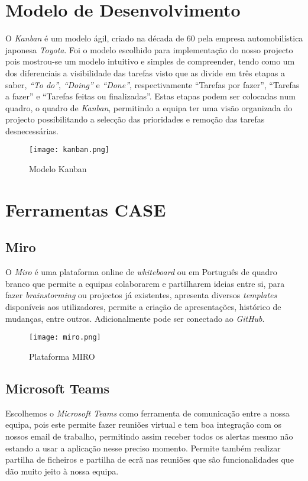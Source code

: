 \documentclass[a4paper]{article}
\begin{document}
\section{Modelo de Desenvolvimento}
O \textit{Kanban} é um modelo ágil, criado na década de 60 pela empresa automobilística japonesa \textit{Toyota}.
Foi o modelo escolhido para implementação do nosso projecto pois mostrou-se um modelo intuitivo e simples de compreender, tendo como um dos diferenciais a visibilidade das tarefas visto que as divide em três etapas a saber, \textit{“To do”}, \textit{“Doing”} e \textit{“Done”}, respectivamente “Tarefas por fazer”, “Tarefas a fazer” e “Tarefas feitas ou finalizadas”. Estas etapas podem ser colocadas num quadro, o quadro de \textit{Kanban}, permitindo a equipa ter uma visão organizada do projecto possibilitando a selecção das prioridades e remoção das tarefas desnecessárias. \cite{Kanban}

\begin{figure}[H]
    \centering
    \texttt{[image: kanban.png]}
    \caption{Modelo Kanban\texttrademark}
    \label{fig:kanban}
\end{figure}

\section{Ferramentas CASE}
\subsection{Miro}
O \textit{Miro} é uma plataforma online de \textit{whiteboard} ou em Português de quadro branco que permite a equipas colaborarem e partilharem ideias entre si, para fazer 
\textit{brainstorming} ou projectos já existentes, apresenta diversos \textit{templates} disponíveis aos utilizadores, permite a criação de apresentações, histórico de mudanças, entre outros. Adicionalmente pode ser conectado ao \textit{GitHub}.

\begin{figure}[H]
    \centering
    \texttt{[image: miro.png]}
    \caption{Plataforma MIRO\texttrademark}
    \label{fig:miro}
\end{figure}

\subsection{Microsoft Teams}
Escolhemos o \textit{Microsoft Teams} como ferramenta de comunicação entre a nossa equipa, pois este permite fazer reuniões virtual e tem boa integração com os nossos email de trabalho, permitindo assim receber todos os alertas mesmo não estando a usar a aplicação nesse preciso momento.
Permite também realizar partilha de ficheiros e partilha de ecrã nas reuniões que são funcionalidades que dão muito jeito à nossa equipa.
\end{document}
